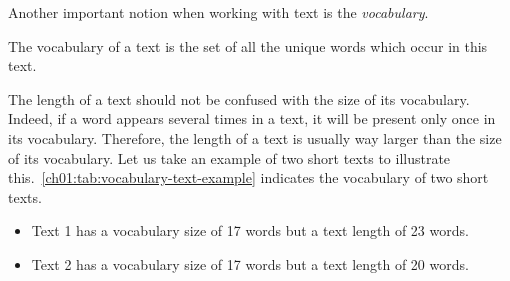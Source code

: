   Another important notion when working with text is the \textit{vocabulary}.

  \theoremstyle{definition}
  \begin{definition}[A vocabulary]
    \label{ch01:def:def-vocabulary}
    The vocabulary of a text is the set of all the unique words which occur in
    this text.
  \end{definition}

  The length of a text should not be confused with the size of its vocabulary.
  Indeed, if a word appears several times in a text, it will be present only
  once in its vocabulary. Therefore, the length of a text is usually way larger
  than the size of its vocabulary. Let us take an example of two short texts to
  illustrate this.~\autoref{ch01:tab:vocabulary-text-example} indicates the
  vocabulary of two short texts.

  \begin{itemize}
    \item Text 1 has a vocabulary size of 17 words but a text length of 23
      words.
    \item Text 2 has a vocabulary size of 17 words but a text length of 20
      words.
  \end{itemize}

  \begin{table}[t]
    \caption{Examples of short texts and their vocabularies.}
    \label{ch01:tab:vocabulary-text-example}
  \end{table}

